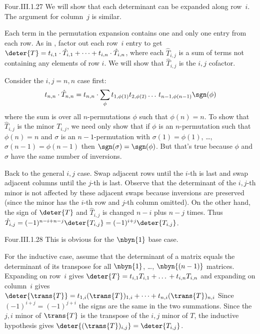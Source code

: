 \begin{ans}{Four.III.1.27}
      We will show that each determinant can be expanded along
      row~\( i \).
      The argument for column~$j$ is similar.

      Each term in the permutation expansion contains one and
      only one entry from each row.
      As in ,
      factor out each row~$i$ entry to get
      \( \deter{T}
           =t_{i,1}\cdot\hat{T}_{i,1}+\dots+t_{i,n}\cdot\hat{T}_{i,n} \),
      where each \( \hat{T}_{i,j} \) is a sum of terms not containing any
      elements of row \( i \).
      We will show that \( \hat{T}_{i,j} \) is the \( i,j \) cofactor.

      Consider the \( i,j=n,n \) case first:
      \begin{equation*}
        t_{n,n}\cdot\hat{T}_{n,n}
        =t_{n,n}\cdot
            \sum_{\phi}t_{1,\phi(1)}t_{2,\phi(2)}\dots\,t_{n-1,\phi(n-1)}
                      \sgn(\phi)
      \end{equation*}
      where the sum is over all \( n \)-permutations \( \phi \) such that
      \( \phi(n)=n \).
      To show that
      \( \hat{T}_{i,j} \) is the minor \( T_{i,j} \), we need only show
      that if \( \phi \) is an \( n \)-permutation such that
      \( \phi(n)=n \) and
      \( \sigma \) is an \( n-1 \)-permutation with
      \( \sigma(1)=\phi(1) \), \ldots, \( \sigma(n-1)=\phi(n-1) \)
      then \( \sgn(\sigma)=\sgn(\phi) \).
      But that's true because $\phi$ and $\sigma$
      have the same number of inversions.

      Back to the general \( i,j \) case.
      Swap adjacent rows until the \( i \)-th is last and swap adjacent
      columns until the \( j \)-th is last.
      Observe that the determinant of the \( i,j \)-th minor is not affected by
      these adjacent
      swaps because inversions are preserved (since the minor has the
      \( i \)-th row and \( j \)-th column omitted).
      On the other hand, the sign of \( \deter{T} \) and \( \hat{T}_{i,j} \)
      is changed \( n-i \) plus \( n-j \) times.
      Thus \( \hat{T}_{i,j}=(-1)^{n-i+n-j}\deter{T_{i,j}}
                =(-1)^{i+j}\deter{T_{i,j}} \).
    
\end{ans}
\begin{ans}{Four.III.1.28}
      This is obvious for the \( \nbyn{1} \) base case.

      For the inductive case,
      assume that the determinant of a matrix equals the determinant of
      its transpose for all \( \nbyn{1} \), \ldots, \( \nbyn{(n-1)} \)
      matrices.
      Expanding on row~\( i \) gives
      \( \deter{T}=t_{i,1}T_{i,1}+\dots\,+t_{i,n}T_{i,n} \)
      and expanding on column~\( i \) gives
      \( \deter{\trans{T}}=t_{1,i}(\trans{T})_{1,i}
           +\dots+t_{n,i}(\trans{T})_{n,i} \)
      Since \( (-1)^{i+j}=(-1)^{j+i} \) the signs are the same in the
      two summations.
      Since the \( j,i \) minor of \( \trans{T} \) is the transpose
      of the \( i,j \) minor of \( T \), the inductive hypothesis
      gives \( \deter{(\trans{T})_{i,j}}=\deter{T_{i,j}} \).
    
\end{ans}
